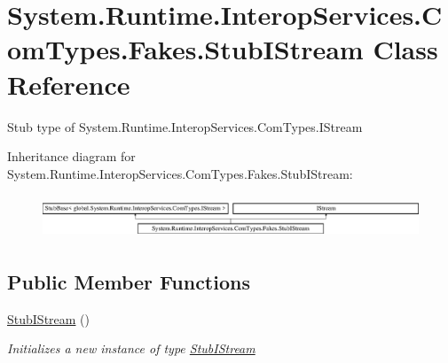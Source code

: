 \hypertarget{class_system_1_1_runtime_1_1_interop_services_1_1_com_types_1_1_fakes_1_1_stub_i_stream}{\section{System.\-Runtime.\-Interop\-Services.\-Com\-Types.\-Fakes.\-Stub\-I\-Stream Class Reference}
\label{class_system_1_1_runtime_1_1_interop_services_1_1_com_types_1_1_fakes_1_1_stub_i_stream}
}


Stub type of System.\-Runtime.\-Interop\-Services.\-Com\-Types.\-I\-Stream 


Inheritance diagram for System.\-Runtime.\-Interop\-Services.\-Com\-Types.\-Fakes.\-Stub\-I\-Stream\-:\begin{figure}[H]
\begin{center}
\leavevmode
\includegraphics[height=1.317647cm]{class_system_1_1_runtime_1_1_interop_services_1_1_com_types_1_1_fakes_1_1_stub_i_stream}
\end{center}
\end{figure}
\subsection*{Public Member Functions}
\begin{DoxyCompactItemize}
\item 
\hyperlink{class_system_1_1_runtime_1_1_interop_services_1_1_com_types_1_1_fakes_1_1_stub_i_stream_ae232c81db5945d30a87eeb2f09c8819d}{Stub\-I\-Stream} ()
\begin{DoxyCompactList}\small\item\em Initializes a new instance of type \hyperlink{class_system_1_1_runtime_1_1_interop_services_1_1_com_types_1_1_fakes_1_1_stub_i_stream}{Stub\-I\-Stream}\end{DoxyCompactList}\end{DoxyCompactItemize}
